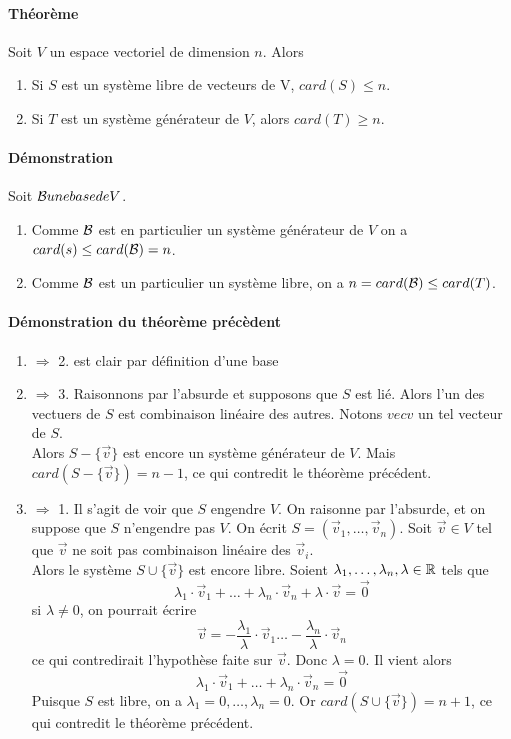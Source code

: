 \paragraph{Théorème} Soit $V$ un espace vectoriel de dimension $n$. Alors 
\begin{enumerate}
  \item Si $S$ est un système libre de vecteurs de V,  $card(S) \leq n$.
  \item Si $T$ est un système générateur de $V$, alors $card(T) \geq n$.
\end{enumerate}
\paragraph{Démonstration} Soit $\mathcal{B} une base de V$.
\begin{enumerate}
  \item Comme $\mathcal{B}$ est en particulier un système générateur de $V$ on a $card(s) \leq card(\mathcal{B}) = n$.
  \item Comme $\mathcal{B}$ est un particulier un système libre, on a $n = card(\mathcal{B}) \leq card(T)$.
\end{enumerate}

\paragraph{Démonstration du théorème précèdent}
\begin{enumerate}
  \item $\Rightarrow$ 2. est clair par définition d'une base
  \item $\Rightarrow$ 3. Raisonnons par l'absurde et supposons que $S$ est lié. Alors l'un des vectuers de $S$ est combinaison linéaire des autres. Notons $vec{v}$ un tel vecteur de $S$. \\
    Alors $S - \{ \vec{v}\}$ est encore un système générateur de $V$. Mais $card(S - \{\vec{v}\}) = n-1$, ce qui contredit le théorème précédent.
  \item $\Rightarrow$ 1. Il s'agit de voir que $S$ engendre $V$. On raisonne par l'absurde, et on suppose que $S$ n'engendre pas $V$. On écrit $S = (\vec{v}_1, \ldots, \vec{v}_n)$. Soit $\vec{v} \in V$ tel que $\vec{v}$ ne soit pas combinaison linéaire des $\vec{v}_i$. \\
    Alors le système $S \cup \{ \vec{v}\}$ est encore libre. Soient $\lambda_1, \ldots, \lambda_n, \lambda \in \mathbb{R}$ tels que 
    $$\lambda_1 \cdot \vec{v}_1 + \ldots + \lambda_n \cdot \vec{v}_n + \lambda \cdot \vec{v} = \vec{0}$$
    si $\lambda \neq 0$, on pourrait écrire 
    $$\vec{v} = -\frac{\lambda_1}{\lambda} \cdot \vec{v}_1 \ldots - \frac{\lambda_n}{\lambda} \cdot \vec{v}_n$$
    ce qui contredirait l'hypothèse faite sur $\vec{v}$. Donc $\lambda = 0$. Il vient alors
    $$\lambda_1 \cdot \vec{v}_1 + \ldots + \lambda_n  \cdot \vec{v}_n = \vec{0}$$
    Puisque $S$ est libre, on a $\lambda_1 = 0, \ldots, \lambda_n = 0$. Or $card(S \cup \{\vec{v}\} ) = n+1$, ce qui contredit le théorème précédent.
\end{enumerate}

